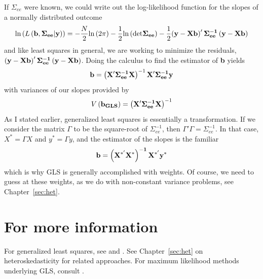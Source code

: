 If $\Sigma_{ee}$ were known, we could write out the log-likelihood function for the slopes of a normally distributed outcome
\begin{equation}
\mbox{ln}\left(L\left({\bf b,\Sigma_{ee} \vert \bf y}\right)\right)=-\frac{N}{2}\mbox{ln}\left(2\pi\right)-\frac{1}{2}\mbox{ln}\left(\mbox{det}\bf \Sigma_{ee}\right)-\frac{1}{2}{\bf \left(y-Xb\right)'\Sigma_{ee}^{-1}\left(y-Xb\right)}
\end{equation}
and like least squares in general, we are working to minimize the residuals, ${\bf \left(y-Xb\right)'\Sigma_{ee}^{-1}\left(y-Xb\right)}$. Doing the calculus to find the estimator of {\bf b} yields
\begin{equation}
{\bf b} = \left({\bf X'\Sigma_{ee}^{-1}X}\right)^{-1}{\bf X'\Sigma_{ee}^{-1}y}
\end{equation}
with variances of our slopes provided by
\begin{equation}
V\left({\bf b_{GLS}}\right)= \left({\bf X'\Sigma_{ee}^{-1}X}\right)^{-1}
\end{equation}
As I stated earlier, generalized least squares is essentially a transformation. If we consider the matrix $\Gamma$ to be the square-root of $\Sigma_{ee}^{-1}$, then $\Gamma'\Gamma = \Sigma_{ee}^{-1}$. In that case, $X^{*} = \Gamma X$ and $y^{*} = \Gamma y$, and the estimator of the slopes is the familiar
\begin{equation}
{\bf b = \left(X^{*'}X^{*}\right)^{-1}X^{*'}y^{*}}
\end{equation}
which is why GLS is generally accomplished with weights. Of course, we need to guess at these weights, as we do with non-constant variance problems, see Chapter~\ref{sec:het}.

\section*{For more information}
For generalized least squares, see \citep{hill} and \citep{cameron2005microeconometrics}. See Chapter~\ref{sec:het} on heteroskedasticity for related approaches. For maximum likelihood methods underlying GLS, consult \citep{eliason1993maximum}.

